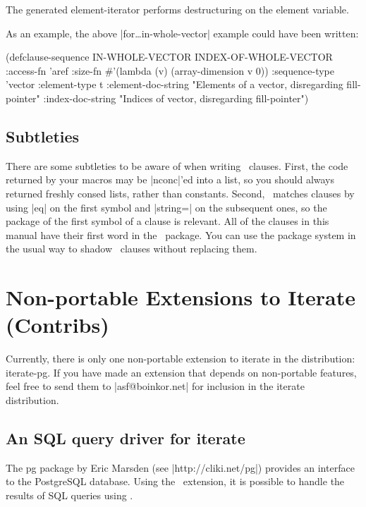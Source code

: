 \begin{clauses}
\cpar The generated element-iterator performs destructuring on the
element variable.

\cpar As an example, the above |for\dots in-whole-vector| example
could have been written:
\begin{program}
(defclause-sequence IN-WHOLE-VECTOR INDEX-OF-WHOLE-VECTOR
  :access-fn 'aref
  :size-fn \#'(lambda (v) (array-dimension v 0))
  :sequence-type 'vector
  :element-type t
  :element-doc-string
     "Elements of a vector, disregarding fill-pointer"
  :index-doc-string
     "Indices of vector, disregarding fill-pointer")
\end{program}

\end{clauses}

\subsection{Subtleties}

There are some subtleties to be aware of when writing \iter\ clauses.
First, the code returned by your macros may be |nconc|'ed into a list,
so you should always returned freshly consed lists, rather than
constants.  Second, \iter\ matches clauses by using |eq| on the first
symbol and |string=| on the subsequent ones, so the package of the
first symbol of a clause is relevant.  All of the clauses in this manual
have their first word in the \iter\ package.
You can use the package system in the usual way to shadow
\iter\ clauses without replacing them.


\section{Non-portable Extensions to Iterate (Contribs)}
\label{contribs}

Currently, there is only one non-portable extension to iterate in the
distribution: iterate-pg. If you have made an extension that depends
on non-portable features, feel free to send them to |asf@boinkor.net|
for inclusion in the iterate distribution.

\subsection{An SQL query driver for iterate}

The pg package by Eric Marsden (see |http://cliki.net/pg|) provides an
interface to the PostgreSQL database. Using the \iterpg\ extension, it
is possible to handle the results of SQL queries using \iter.

